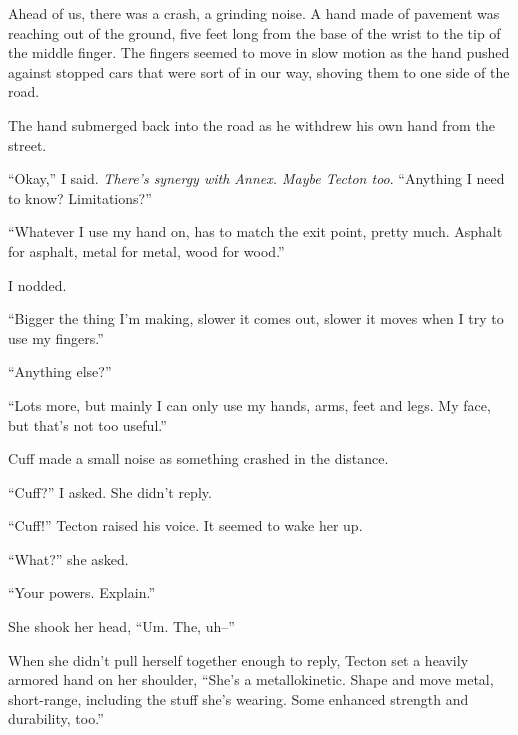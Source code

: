 Ahead of us, there was a crash, a grinding noise.  A hand made of pavement was reaching out of the ground, five feet long from the base of the wrist to the tip of the middle finger.  The fingers seemed to move in slow motion as the hand pushed against stopped cars that were sort of in our way, shoving them to one side of the road.



The hand submerged back into the road as he withdrew his own hand from the street.



``Okay,'' I said.  \emph{There's synergy with Annex.  Maybe Tecton too}.  ``Anything I need to know?  Limitations?''



``Whatever I use my hand on, has to match the exit point, pretty much.  Asphalt for asphalt, metal for metal, wood for wood.''



I nodded.



``Bigger the thing I'm making, slower it comes out, slower it moves when I try to use my fingers.''



``Anything else?''



``Lots more, but mainly I can only use my hands, arms, feet and legs.  My face, but that's not too useful.''



Cuff made a small noise as something crashed in the distance.



``Cuff?'' I asked.  She didn't reply.



``Cuff!'' Tecton raised his voice.  It seemed to wake her up.



``What?'' she asked.



``Your powers.  Explain.''



She shook her head, ``Um.  The, uh--''



When she didn't pull herself together enough to reply, Tecton set a heavily armored hand on her shoulder, ``She's a metallokinetic.  Shape and move metal, short-range, including the stuff she's wearing.  Some enhanced strength and durability, too.''



